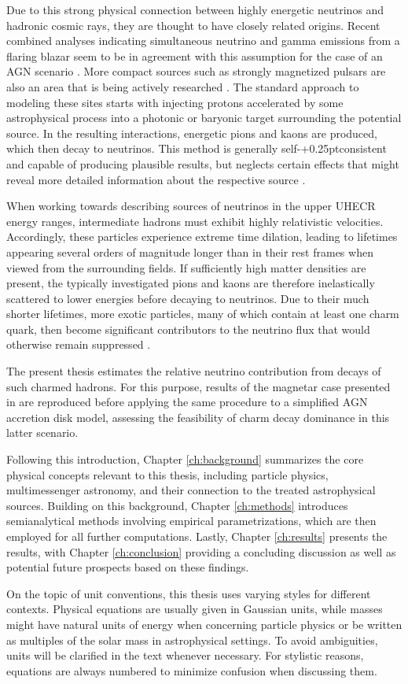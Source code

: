 Due to this strong physical connection between highly energetic neutrinos and hadronic cosmic rays, they are thought to have
closely related origins. Recent combined analyses indicating simultaneous neutrino and gamma emissions from a
flaring blazar seem to be in agreement with this assumption for the case of an AGN scenario \cite{ic_blazar_flare, ic_blazar_signal}.
More compact sources such as strongly magnetized pulsars are also an area that is being actively researched \cite{Murase_2009}.
The standard approach to modeling these sites starts with injecting protons accelerated by some astrophysical process into
a photonic or baryonic target surrounding the potential source. In the resulting interactions, energetic pions and kaons are
produced, which then decay to neutrinos. This method is generally self-{\kern+0.25pt}consistent and capable of producing
plausible results, but neglects certain effects that might reveal more detailed information about the respective source
\cite{Carpio_2020}.

When working towards describing sources of neutrinos in the upper UHECR energy ranges, intermediate hadrons must exhibit
highly relativistic velocities. Accordingly, these particles experience extreme time dilation, leading to lifetimes
appearing several orders of magnitude longer than in their rest frames when viewed from the surrounding fields.
If sufficiently high matter densities are present, the typically investigated pions and kaons are therefore inelastically
scattered to lower energies before decaying to neutrinos. Due to their much shorter lifetimes, more exotic particles, many
of which contain at least one charm quark, then become significant contributors to the neutrino flux that would otherwise
remain suppressed \cite{Tjus_2023}.

The present thesis estimates the relative neutrino contribution from decays of such charmed hadrons. For this purpose, results
of the magnetar case presented in \cite{Carpio_2020} are reproduced before applying the same procedure to a simplified AGN
accretion disk model, assessing the feasibility of charm decay dominance in this latter scenario.

Following this introduction, Chapter \ref{ch:background} summarizes the core physical concepts relevant to this thesis,
including particle physics, multimessenger astronomy, and their connection to the treated astrophysical sources. Building
on this background, Chapter \ref{ch:methods} introduces semianalytical methods involving empirical parametrizations,
which are then employed for all further computations. Lastly, Chapter \ref{ch:results} presents the results, with Chapter
\ref{ch:conclusion} providing a concluding discussion as well as potential future prospects based on these findings.

On the topic of unit conventions, this thesis uses varying styles for different contexts. Physical equations are usually given
in Gaussian units, while masses might have natural units of energy when concerning particle physics or be written as multiples
of the solar mass in astrophysical settings. To avoid ambiguities, units will be clarified in the text whenever necessary. For
stylistic reasons, equations are always numbered to minimize confusion when discussing them.
